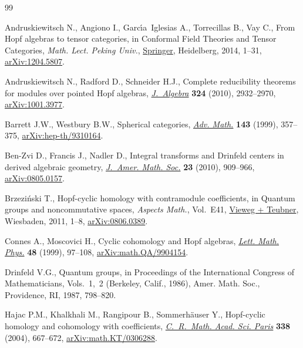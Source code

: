 \documentclass[pdftex]{sigma}
\numberwithin{equation}{section}
\begin{document}
\begin{thebibliography}{99}
\footnotesize\itemsep=0pt

Andruskiewitsch N., Angiono I., Garc\'{\i}a~Iglesias A., Torrecillas B., Vay
 C., From {H}opf algebras to tensor ca\-te\-gories, in Conformal Field Theories
 and Tensor Categories, \textit{Math. Lect. Peking Univ.}, \href{https://doi.org/10.1007/978-3-642-39383-9_1}{Springer}, Heidelberg, 2014,
 1--31, \href{https://arxiv.org/abs/1204.5807}{arXiv:1204.5807}.

Andruskiewitsch N., Radford D., Schneider H.J., Complete reducibility theorems
 for modules over pointed {H}opf algebras, \href{https://doi.org/10.1016/j.jalgebra.2010.06.002}{\textit{J.~Algebra}} \textbf{324}
 (2010), 2932--2970, \href{https://arxiv.org/abs/1001.3977}{arXiv:1001.3977}.

Barrett J.W., Westbury B.W., Spherical categories, \href{https://doi.org/10.1006/aima.1998.1800}{\textit{Adv. Math.}}
 \textbf{143} (1999), 357--375, \href{https://arxiv.org/abs/hep-th/9310164}{arXiv:hep-th/9310164}.

Ben-Zvi D., Francis J., Nadler D., Integral transforms and {D}rinfeld centers
 in derived algebraic geometry, \href{https://doi.org/10.1090/S0894-0347-10-00669-7}{\textit{J.~Amer. Math. Soc.}} \textbf{23}
 (2010), 909--966, \href{https://arxiv.org/abs/0805.0157}{arXiv:0805.0157}.

Brzezi\'nski T., Hopf-cyclic homology with contramodule coefficients, in
 Quantum groups and noncommutative spaces, \textit{Aspects Math.}, Vol.~E41,
 \href{https://doi.org/10.1007/978-3-8348-9831-9_1}{Vieweg + Teubner}, Wiesbaden, 2011, 1--8, \href{https://arxiv.org/abs/0806.0389}{arXiv:0806.0389}.

Connes A., Moscovici H., Cyclic cohomology and {H}opf algebras, \href{https://doi.org/10.1023/A:1007527510226}{\textit{Lett.
 Math. Phys.}} \textbf{48} (1999), 97--108, \href{https://arxiv.org/abs/math.QA/9904154}{arXiv:math.QA/9904154}.

Drinfeld V.G., Quantum groups, in Proceedings of the {I}nternational {C}ongress
 of {M}athematicians, {V}ols.~1,~2 ({B}erkeley, {C}alif., 1986), Amer. Math.
 Soc., Providence, RI, 1987, 798--820.

Hajac P.M., Khalkhali M., Rangipour B., Sommerh\"auser Y., Hopf-cyclic homology
 and cohomology with coefficients, \href{https://doi.org/10.1016/j.crma.2003.11.036}{\textit{C.~R.~Math. Acad. Sci. Paris}}
 \textbf{338} (2004), 667--672, \href{https://arxiv.org/abs/math.KT/0306288}{arXiv:math.KT/0306288}.


\end{thebibliography}
\end{document}

